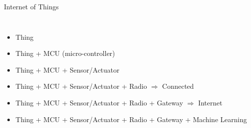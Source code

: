 \begin{frame}{Internet of Things}
  \begin{columns}
    \scriptsize
    \begin{itemize}
    \item Thing
    \item Thing + MCU (micro-controller)
    \item Thing + MCU + Sensor/Actuator
    \item Thing + MCU + Sensor/Actuator + Radio $\Rightarrow$ Connected
    \item Thing + MCU + Sensor/Actuator + Radio + Gateway $\Rightarrow$ Internet
    \item Thing + MCU + Sensor/Actuator + Radio + Gateway + Machine Learning
    \end{itemize}


\end{columns}
\end{frame}
